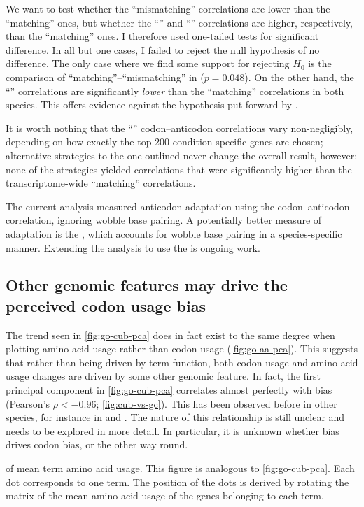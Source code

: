 We want to test whether the “mismatching” correlations are lower than the
“matching” ones, but whether the “” and “” correlations are
higher, respectively, than the “matching” ones. I therefore used one-tailed
tests for significant difference. In all but one cases, I failed to reject the
null hypothesis of no difference. The only case where we find some support for
rejecting \(H_0\) is the comparison of “matching”--“mismatching” in \hsa (\(p =
0.048\)). On the other hand, the “” correlations are significantly
\emph{lower} than the “matching” correlations in both species. This offers
evidence against the hypothesis put forward by \citet{Gingold:2014}.

It is worth nothing that the “” codon--anticodon correlations vary
non-negligibly, depending on how exactly the top \num{200} condition-specific
genes are chosen; alternative strategies to the one outlined never change the
overall result, however: none of the strategies yielded correlations that were
significantly higher than the transcriptome-wide “matching” correlations.

The current analysis measured \trna anticodon adaptation using the
codon--anticodon correlation, ignoring wobble base pairing. A potentially better
measure of \trna adaptation is the \tai, which accounts for wobble base pairing
in a species-specific manner. Extending the analysis to use the \tai is ongoing
work.

\subsection{Other genomic features may drive the perceived codon usage bias}

The trend seen in \cref{fig:go-cub-pca} does in fact exist to the same degree
when plotting amino acid usage rather than codon usage (\cref{fig:go-aa-pca}).
This suggests that rather than being driven by \go term function, both codon
usage and amino acid usage changes are driven by some other genomic feature. In
fact, the first principal component in \cref{fig:go-cub-pca} correlates almost
perfectly with \gc bias (Pearson’s \(\rho < -0.96\); \cref{fig:cub-vs-gc}).
This has been observed before in other species, for instance in 
and  \citep{Duret:2002}. The nature of this relationship is still
unclear and needs to be explored in more detail. In particular, it is unknown
whether \gc bias drives codon bias, or the other way round.

    {\pca of mean \go term amino acid usage.}
    {This figure is analogous to \cref{fig:go-cub-pca}. Each dot corresponds to
    one \go term. The position of the dots is derived by rotating the matrix of
    the mean amino acid usage of the genes belonging to each \go term.}

